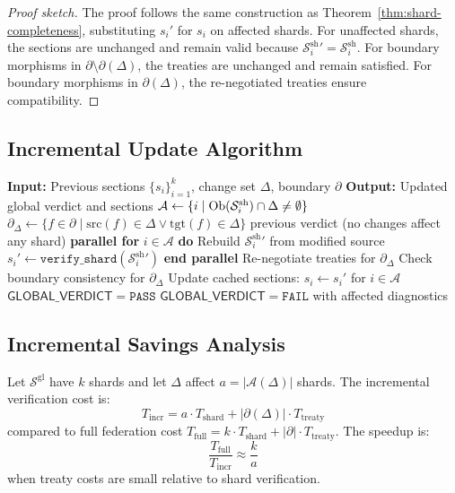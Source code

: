 \documentclass[11pt]{article}
\newcommand{\ShardSite}{\mathcal{S}^{\mathrm{sh}}}
\newcommand{\GlobalSite}{\mathcal{S}^{\mathrm{gl}}}
\newcommand{\GlobalVerdict}{\ensuremath{\mathsf{GLOBAL\_VERDICT}}}
\begin{document}
\begin{proof}[Proof sketch]
The proof follows the same construction as
Theorem~\ref{thm:shard-completeness}, substituting $s_i'$ for $s_i$
on affected shards.  For unaffected shards, the sections are unchanged
and remain valid because $\ShardSite_i' = \ShardSite_i$.  For boundary
morphisms in $\partial \setminus \partial(\Delta)$, the treaties are
unchanged and remain satisfied.  For boundary morphisms in
$\partial(\Delta)$, the re-negotiated treaties ensure compatibility.
\end{proof}

\subsection{Incremental Update Algorithm}

\begin{algorithm}[H]
\caption{Incremental Verification Update}
\label{alg:incremental}
\begin{algorithmic}[1]
\STATE \textbf{Input:} Previous sections $\{s_i\}_{i=1}^k$, change
       set $\Delta$, boundary $\partial$
\STATE \textbf{Output:} Updated global verdict and sections
\STATE $\mathcal{A} \gets \{i \mid \Ob(\ShardSite_i) \cap \Delta
       \neq \emptyset\}$
\STATE $\partial_\Delta \gets \{f \in \partial \mid \mathrm{src}(f)
       \in \Delta \lor \mathrm{tgt}(f) \in \Delta\}$
  \RETURN previous verdict (no changes affect any shard)
\ENDIF
\STATE \textbf{parallel for} $i \in \mathcal{A}$ \textbf{do}
  \STATE \quad Rebuild $\ShardSite_i'$ from modified source
  \STATE \quad $s_i' \gets \texttt{verify\_shard}(\ShardSite_i')$
\STATE \textbf{end parallel}
\STATE Re-negotiate treaties for $\partial_\Delta$
\STATE Check boundary consistency for $\partial_\Delta$
  \STATE Update cached sections: $s_i \gets s_i'$ for $i \in
         \mathcal{A}$
  \RETURN $\GlobalVerdict = \texttt{PASS}$
\ELSE
  \RETURN $\GlobalVerdict = \texttt{FAIL}$ with affected diagnostics
\ENDIF
\end{algorithmic}
\end{algorithm}

\subsection{Incremental Savings Analysis}

\begin{proposition}\label{prop:incremental-speedup}
Let $\GlobalSite$ have $k$ shards and let $\Delta$ affect
$a = |\mathcal{A}(\Delta)|$ shards.  The incremental verification
cost is:
\[
  T_{\mathrm{incr}} = a \cdot T_{\mathrm{shard}} +
  |\partial(\Delta)| \cdot T_{\mathrm{treaty}}
\]
compared to full federation cost $T_{\mathrm{full}} = k \cdot
T_{\mathrm{shard}} + |\partial| \cdot T_{\mathrm{treaty}}$.  The
speedup is:
\[
  \frac{T_{\mathrm{full}}}{T_{\mathrm{incr}}} \approx \frac{k}{a}
\]
when treaty costs are small relative to shard verification.
\end{proposition}
\end{document}
